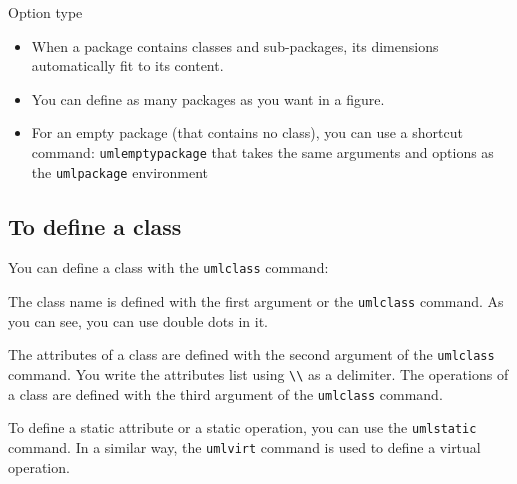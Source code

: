 \documentclass[a4paper,11pt]{report}
\begin{document}
\begin{minipage}{0.5\textwidth}
	
\end{minipage}
\begin{minipage}{0.4\textwidth}
	\begin{center}
	\end{center}
\end{minipage}

Option type

\begin{itemize}
	\item When a package contains classes and sub-packages, its dimensions automatically fit to its content.
	\item You can define as many packages as you want in a figure.
	\item For an empty package (that contains no class), you can use a shortcut command: {\tt umlemptypackage} that takes the same arguments and options as the {\tt umlpackage} environment
\end{itemize}

\subsection{To define a class}\label{ss.class}

You can define a class with the {\tt umlclass} command:

\medskip

\begin{minipage}{0.5\textwidth}
	
\end{minipage}
\begin{minipage}{0.4\textwidth}
	\begin{center}
	\end{center}
\end{minipage}

\medskip

The class name is defined with the first argument or the {\tt umlclass} command. As you can see, you can use double dots in it.

The attributes of a class are defined with the second argument of the {\tt umlclass} command. You write the attributes list using \lstinline{\\} as a delimiter. The operations of a class are defined with the third argument of the {\tt umlclass} command.

To define a static attribute or a static operation, you can use the {\tt umlstatic} command. In a similar way, the {\tt umlvirt} command is used to define a virtual operation.
\end{document}
